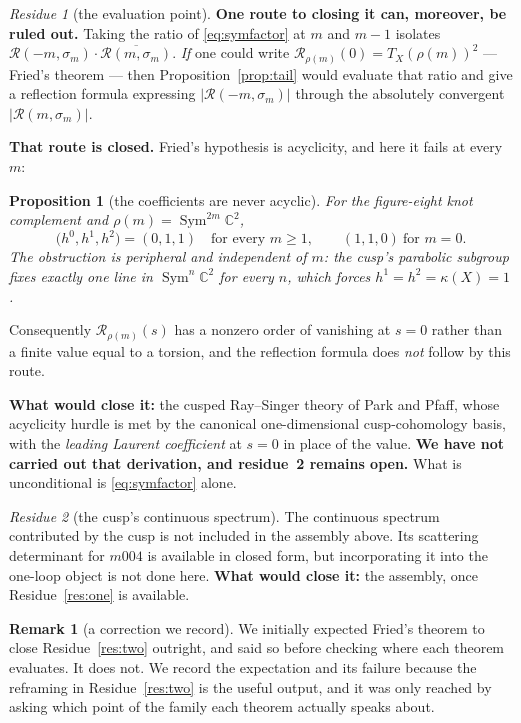 \documentclass[11pt,a4paper]{article}
\newtheorem{proposition}[theorem]{Proposition}
\theoremstyle{definition}
\newtheorem{remark}[theorem]{Remark}
\theoremstyle{remark}
\newtheorem{residue}{Residue}
\newcommand{\C}{\mathbb{C}}
\newcommand{\Sym}{\operatorname{Sym}}
\newcommand{\Rz}{\mathcal{R}}
\begin{document}
\begin{residue}[the evaluation point]
\textbf{One route to closing it can, moreover, be ruled out.} Taking the ratio of \eqref{eq:symfactor} at $m$ and $m-1$ isolates
$\Rz(-m,\sigma_m)\cdot\overline{\Rz(m,\sigma_m)}$. \emph{If} one could write
$\Rz_{\rho(m)}(0)=T_X(\rho(m))^2$ --- Fried's theorem --- then Proposition~\ref{prop:tail} would
evaluate that ratio and give a reflection formula expressing $|\Rz(-m,\sigma_m)|$ through the
absolutely convergent $|\Rz(m,\sigma_m)|$.

\textbf{That route is closed.} Fried's hypothesis is acyclicity, and here it fails at every $m$:

\begin{proposition}[the coefficients are never acyclic]\label{prop:acyclic}
For the figure-eight knot complement and $\rho(m)=\Sym^{2m}\C^2$,
\[
   \bigl(h^0,h^1,h^2\bigr)=(0,1,1)\quad\text{for every }m\ge1,
   \qquad (1,1,0)\ \text{for } m=0 .
\]
The obstruction is peripheral and independent of $m$: the cusp's parabolic subgroup fixes
\emph{exactly one} line in $\Sym^{n}\C^2$ for every $n$, which forces $h^1=h^2=\kappa(X)=1$.
\end{proposition}

Consequently $\Rz_{\rho(m)}(s)$ has a nonzero order of vanishing at $s=0$ rather than a finite
value equal to a torsion, and the reflection formula does \emph{not} follow by this route.

\textbf{What would close it:} the cusped Ray--Singer theory of Park and Pfaff, whose acyclicity
hurdle is met by the canonical one-dimensional cusp-cohomology basis, with the \emph{leading
Laurent coefficient} at $s=0$ in place of the value. \textbf{We have not carried out that
derivation, and residue~2 remains open.} What is unconditional is \eqref{eq:symfactor} alone.
\end{residue}

\begin{residue}[the cusp's continuous spectrum]\label{res:three}
The continuous spectrum contributed by the cusp is not included in the assembly above. Its
scattering determinant for $m004$ is available in closed form, but incorporating it into the
one-loop object is not done here. \textbf{What would close it:} the assembly, once
Residue~\ref{res:one} is available.
\end{residue}

\begin{remark}[a correction we record]
We initially expected Fried's theorem to close Residue~\ref{res:two} outright, and said so
before checking where each theorem evaluates. It does not. We record the expectation and its
failure because the reframing in Residue~\ref{res:two} is the useful output, and it was only
reached by asking which point of the family each theorem actually speaks about.
\end{remark}
\end{document}

